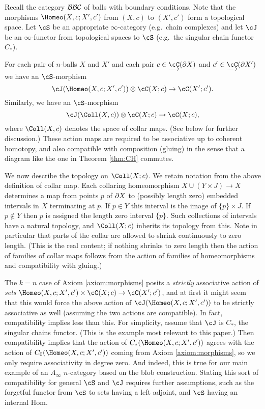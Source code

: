 Recall the category ${\mathcal{BBC}}$ of balls with boundary conditions.
Note that the morphisms $\Homeo(X,c; X', c')$ from $(X, c)$ to $(X', c')$ form a topological space.
Let $\cS$ be an appropriate $\infty$-category (e.g.\ chain complexes)
and let $\cJ$ be an $\infty$-functor from topological spaces to $\cS$
(e.g.\ the singular chain functor $C_*$).

\begin{axiom}
\label{axiom:families}
For each pair of $n$-balls $X$ and $X'$ and each pair $c\in \cl{\cC}(\bd X)$ and $c'\in \cl{\cC}(\bd X')$ we have an $\cS$-morphism
\[
	\cJ(\Homeo(X,c; X', c')) \ot \cC(X; c) \to \cC(X'; c') .
\]
Similarly, we have an $\cS$-morphism
\[
	\cJ(\Coll(X,c)) \ot \cC(X; c) \to \cC(X; c),
\]
where $\Coll(X,c)$ denotes the space of collar maps.
(See below for further discussion.)
These action maps are required to be associative up to coherent homotopy,
and also compatible with composition (gluing) in the sense that
a diagram like the one in Theorem \ref{thm:CH} commutes.
\end{axiom}

We now describe the topology on $\Coll(X; c)$.
We retain notation from the above definition of collar map.
Each collaring homeomorphism $X \cup (Y\times J) \to X$ determines a map from points $p$ of $\partial X$ to
(possibly length zero) embedded intervals in $X$ terminating at $p$.
If $p \in Y$ this interval is the image of $\{p\}\times J$.
If $p \notin Y$ then $p$ is assigned the length zero interval $\{p\}$.
Such collections of intervals have a natural topology, and $\Coll(X; c)$ inherits its topology from this.
Note in particular that parts of the collar are allowed to shrink continuously to zero length.
(This is the real content; if nothing shrinks to zero length then the action of families of collar
maps follows from the action of families of homeomorphisms and compatibility with gluing.)

The $k=n$ case of Axiom \ref{axiom:morphisms} posits a {\it strictly} associative action of {\it sets}
$\Homeo(X,c; X', c') \times \cC(X; c) \to \cC(X'; c')$, and at first it might seem that this would force the above
action of $\cJ(\Homeo(X,c; X', c'))$ to be strictly associative as well (assuming the two actions are compatible).
In fact, compatibility implies less than this.
For simplicity, assume that $\cJ$ is $C_*$, the singular chains functor.
(This is the example most relevant to this paper.)
Then compatibility implies that the action of $C_*(\Homeo(X,c; X', c'))$ agrees with the action
of $C_0(\Homeo(X,c; X', c'))$ coming from Axiom \ref{axiom:morphisms}, so we only require associativity in degree zero.
And indeed, this is true for our main example of an $A_\infty$ $n$-category based on the blob construction.
Stating this sort of compatibility for general $\cS$ and $\cJ$ requires further assumptions, 
such as the forgetful functor from $\cS$ to sets having a left adjoint, and $\cS$ having an internal Hom.

